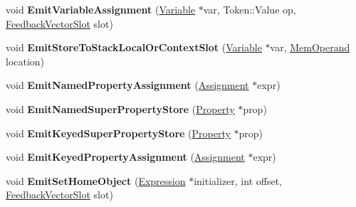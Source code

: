 \begin{DoxyCompactItemize}
\item 
void {\bfseries Emit\+Variable\+Assignment} (\hyperlink{classv8_1_1internal_1_1_variable}{Variable} $\ast$var, Token\+::\+Value op, \hyperlink{classv8_1_1internal_1_1_feedback_vector_slot}{Feedback\+Vector\+Slot} slot)\hypertarget{classv8_1_1internal_1_1_full_code_generator_a00b9c1d7e50908010e4d114347b04903}{}\label{classv8_1_1internal_1_1_full_code_generator_a00b9c1d7e50908010e4d114347b04903}

\item 
void {\bfseries Emit\+Store\+To\+Stack\+Local\+Or\+Context\+Slot} (\hyperlink{classv8_1_1internal_1_1_variable}{Variable} $\ast$var, \hyperlink{classv8_1_1internal_1_1_mem_operand}{Mem\+Operand} location)\hypertarget{classv8_1_1internal_1_1_full_code_generator_aa41d5b2ecbe02f1c2f03c2fee71c5352}{}\label{classv8_1_1internal_1_1_full_code_generator_aa41d5b2ecbe02f1c2f03c2fee71c5352}

\item 
void {\bfseries Emit\+Named\+Property\+Assignment} (\hyperlink{classv8_1_1internal_1_1_assignment}{Assignment} $\ast$expr)\hypertarget{classv8_1_1internal_1_1_full_code_generator_ad9c2003c96718adac80607b67a86ef01}{}\label{classv8_1_1internal_1_1_full_code_generator_ad9c2003c96718adac80607b67a86ef01}

\item 
void {\bfseries Emit\+Named\+Super\+Property\+Store} (\hyperlink{classv8_1_1internal_1_1_property}{Property} $\ast$prop)\hypertarget{classv8_1_1internal_1_1_full_code_generator_a05f8ba2c09f904f6d767bfd3542f4c45}{}\label{classv8_1_1internal_1_1_full_code_generator_a05f8ba2c09f904f6d767bfd3542f4c45}

\item 
void {\bfseries Emit\+Keyed\+Super\+Property\+Store} (\hyperlink{classv8_1_1internal_1_1_property}{Property} $\ast$prop)\hypertarget{classv8_1_1internal_1_1_full_code_generator_a25826c5f25128636a331c12c095d6413}{}\label{classv8_1_1internal_1_1_full_code_generator_a25826c5f25128636a331c12c095d6413}

\item 
void {\bfseries Emit\+Keyed\+Property\+Assignment} (\hyperlink{classv8_1_1internal_1_1_assignment}{Assignment} $\ast$expr)\hypertarget{classv8_1_1internal_1_1_full_code_generator_a3d9117bf1520c55c9db475f4fbe96757}{}\label{classv8_1_1internal_1_1_full_code_generator_a3d9117bf1520c55c9db475f4fbe96757}

\item 
void {\bfseries Emit\+Set\+Home\+Object} (\hyperlink{classv8_1_1internal_1_1_expression}{Expression} $\ast$initializer, int offset, \hyperlink{classv8_1_1internal_1_1_feedback_vector_slot}{Feedback\+Vector\+Slot} slot)\hypertarget{classv8_1_1internal_1_1_full_code_generator_a32cc92ef45d76f82c3b3e10017a11416}{}\label{classv8_1_1internal_1_1_full_code_generator_a32cc92ef45d76f82c3b3e10017a11416}


\end{DoxyCompactItemize}
